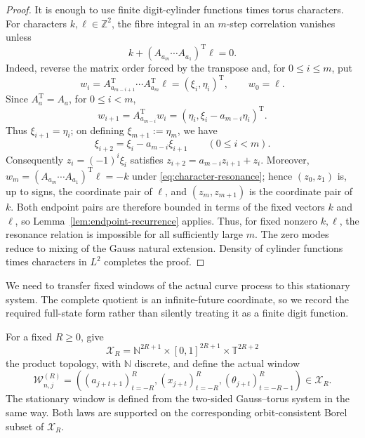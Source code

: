 \documentclass[11pt,a4paper]{amsart}
\theoremstyle{definition}
\theoremstyle{remark}
\newcommand{\T}{\mathbb T}
\newcommand{\N}{\mathbb N}
\newcommand{\Z}{\mathbb Z}
\begin{document}
\begin{proof}
It is enough to use finite digit-cylinder functions times torus characters.
For characters $k,\ell\in\Z^2$, the fibre integral in an $m$-step
correlation vanishes unless
\begin{equation}\label{eq:character-resonance}
 k+(A_{a_m}\cdots A_{a_1})^{\mathrm T}\ell=0.
\end{equation}
Indeed, reverse the matrix order forced by the transpose and, for
$0\le i\le m$, put
\[
 w_i=A_{a_{m-i+1}}^{\mathrm T}\cdots A_{a_m}^{\mathrm T}\ell
     =(\xi_i,\eta_i)^{\mathrm T},
 \qquad w_0=\ell.
\]
Since $A_a^{\mathrm T}=A_a$, for $0\le i<m$,
\[
 w_{i+1}=A_{a_{m-i}}^{\mathrm T}w_i
          =(\eta_i,\xi_i-a_{m-i}\eta_i)^{\mathrm T}.
\]
Thus $\xi_{i+1}=\eta_i$; on defining $\xi_{m+1}:=\eta_m$, we have
\[
 \xi_{i+2}=\xi_i-a_{m-i}\xi_{i+1}
 \qquad(0\le i<m).
\]
Consequently $z_i=(-1)^i\xi_i$ satisfies
$z_{i+2}=a_{m-i}z_{i+1}+z_i$.  Moreover,
$w_m=(A_{a_m}\cdots A_{a_1})^{\mathrm T}\ell=-k$ under
\eqref{eq:character-resonance}; hence $(z_0,z_1)$ is, up to signs, the
coordinate pair of $\ell$, and $(z_m,z_{m+1})$ is the coordinate pair of
$k$.  Both endpoint pairs are therefore bounded in terms of the fixed
vectors $k$ and $\ell$, so
Lemma~\ref{lem:endpoint-recurrence} applies.  Thus, for fixed nonzero
$k,\ell$, the resonance relation is
impossible for all sufficiently large $m$.  The zero modes reduce to mixing
of the Gauss natural extension.
Density of cylinder functions times characters in $L^2$ completes the proof.
\end{proof}

We need to transfer fixed windows of the actual curve process to this
stationary system.  The complete quotient is an infinite-future coordinate,
so we record the required full-state form rather than silently treating it as
a finite digit function.

For a fixed $R\ge0$, give
\begin{equation}\label{eq:window-space}
 \mathcal X_R
 =\N^{2R+1}\times[0,1]^{2R+1}\times\T^{2R+2}
\end{equation}
the product topology, with $\N$ discrete, and define the actual window
\begin{equation}\label{eq:actual-window}
 \mathcal W_{n,j}^{(R)}=
 \left((a_{j+t+1})_{t=-R}^{R},
       (x_{j+t})_{t=-R}^{R},
       (\theta_{j+t})_{t=-R-1}^{R}\right)\in\mathcal X_R.
\end{equation}
The stationary window is defined from the two-sided Gauss--torus system in
the same way.  Both laws are supported on the corresponding orbit-consistent
Borel subset of $\mathcal X_R$.
\end{document}
